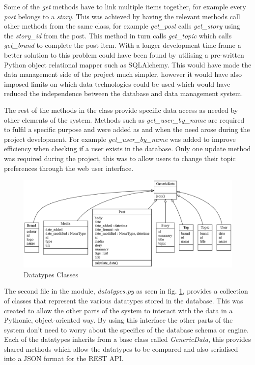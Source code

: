\documentclass[12pt,titlepage]{article}
\begin{document}
  Some of the \textit{get} methods have to link multiple items together, for
  example every \textit{post} belongs to a \textit{story}. This was achieved by
  having the relevant methods call other methods from the same class, for
  example \textit{get\_post} calls \textit{get\_story} using the \textit{story\_id}
  from the post. This method in turn calls \textit{get\_topic} which calls
  \textit{get\_brand} to complete the post item. With a longer development
  time frame a better solution to this problem could have been found by utilising
  a pre-written Python object relational mapper such as SQLAlchemy. This would
  have made the data management side of the project much simpler, however it
  would have also imposed limits on which data technologies could be used which
  would have reduced the independence between the database and data management
  system.

  The rest of the methods in the class provide specific data access as needed by
  other elements of the system. Methods such as \textit{get\_user\_by\_name} are
  required to fulfil a specific purpose and were added as and when the need
  arose during the project development. For example \textit{get\_user\_by\_name}
  was added to improve efficiency when checking if a user exists in the
  database. Only one update method was required during the project, this was to
  allow users to change their topic preferences through the web user interface.

  \begin{figure}[ht]
    \centering
    \includegraphics[width=\textwidth]{../img/datatypes.png}
    \caption{Datatypes Classes}
    \label{fig:datatypes}
  \end{figure}

  The second file in the module, \textit{datatypes.py} as seen in fig.
  \ref{fig:datatypes}, provides a collection of classes that represent the
  various datatypes stored in the database. This was created to allow the other
  parts of the system to interact with the data in a Pythonic, object-oriented
  way. By using this interface the other parts of the system don't need to worry
  about the specifics of the database schema or engine. Each of the datatypes
  inherits from a base class called \textit{GenericData}, this provides shared
  methods which allow the datatypes to be compared and also serialised into a
  JSON format for the REST API.
\end{document}
